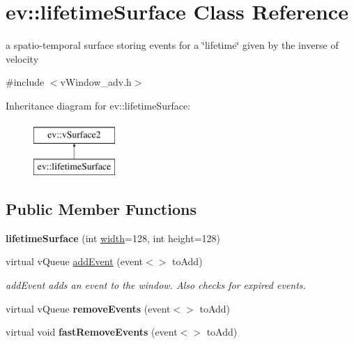 \hypertarget{classev_1_1lifetimeSurface}{}\section{ev\+:\+:lifetime\+Surface Class Reference}
\label{classev_1_1lifetimeSurface}


a spatio-\/temporal surface storing events for a \char`\"{}lifetime\char`\"{} given by the inverse of velocity  




{\ttfamily \#include $<$v\+Window\+\_\+adv.\+h$>$}

Inheritance diagram for ev\+:\+:lifetime\+Surface\+:\begin{figure}[H]
\begin{center}
\leavevmode
\includegraphics[height=2.000000cm]{classev_1_1lifetimeSurface}
\end{center}
\end{figure}
\subsection*{Public Member Functions}
\begin{DoxyCompactItemize}
\item 
\mbox{\label{classev_1_1lifetimeSurface_a8276286d48b5baf2829268333f99b482}} 
{\bfseries lifetime\+Surface} (int \hyperlink{classev_1_1vSurface2_a1aa8027816352a15d5b9bf1f26f48e76}{width}=128, int height=128)
\item 
virtual v\+Queue \hyperlink{classev_1_1lifetimeSurface_a8fce037a13281c0e46c7d660e0ea2275}{add\+Event} (event$<$$>$ to\+Add)
\begin{DoxyCompactList}\small\item\em add\+Event adds an event to the window. Also checks for expired events. \end{DoxyCompactList}\item 
\mbox{\label{classev_1_1lifetimeSurface_a86fde904d007b5b1e5f52351bfab0b17}} 
virtual v\+Queue {\bfseries remove\+Events} (event$<$$>$ to\+Add)
\item 
\mbox{\label{classev_1_1lifetimeSurface_a5502828fe59c4394588acb6ffa06d445}} 
virtual void {\bfseries fast\+Remove\+Events} (event$<$$>$ to\+Add)
\end{DoxyCompactItemize}
